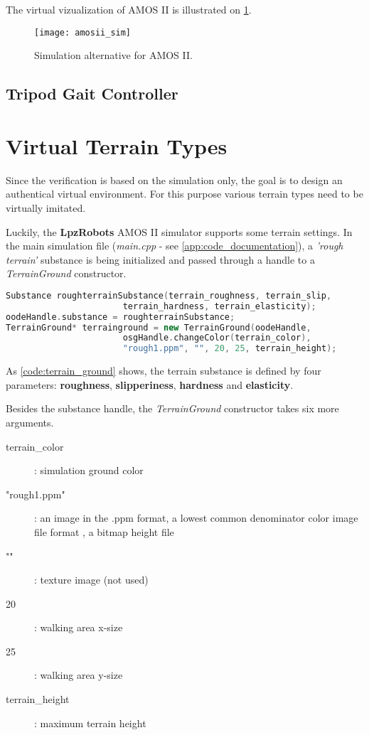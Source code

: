 The virtual vizualization of AMOS II is illustrated on \cref{img:amosii_sim}.

\begin{figure}[H]
  \centering
  \texttt{[image: amosii\_sim]}
  \caption{Simulation alternative for AMOS II.}
  \label{img:amosii_sim}
\end{figure}

\subsection{Tripod Gait Controller} \label{ssec:tripod_gait_controller}


\section{Virtual Terrain Types} \label{sec:virtual_terrain_types}
Since the verification is based on the simulation only, the goal is to design an authentical virtual environment. For this purpose various terrain types need to be virtually imitated.

Luckily, the \textbf{LpzRobots} AMOS II simulator supports some terrain settings. In the main simulation file (\textit{main.cpp} - see \ref{app:code_documentation}), a \textit{'rough terrain'} substance is being initialized and passed through a handle to a \textit{TerrainGround} constructor.

\begin{lstlisting}[language=C++, caption={Setting a terrain ground in main.cpp}, label=code:terrain_ground]
Substance roughterrainSubstance(terrain_roughness, terrain_slip,
                       terrain_hardness, terrain_elasticity);
oodeHandle.substance = roughterrainSubstance;
TerrainGround* terrainground = new TerrainGround(oodeHandle, 
                       osgHandle.changeColor(terrain_color),
                       "rough1.ppm", "", 20, 25, terrain_height);
\end{lstlisting}

As \cref{code:terrain_ground} shows, the terrain substance is defined by four parameters: \textbf{roughness}, \textbf{slipperiness}, \textbf{hardness} and \textbf{elasticity}.

Besides the substance handle, the \textit{TerrainGround} constructor takes six more arguments.

\begin{description}
\item[terrain\_color] : simulation ground color
\item["rough1.ppm"] : an image in the .ppm format, a lowest common denominator color image file format \citep{misc:ppm}, a bitmap height file
\item[""] : texture image (not used)
\item[20] : walking area x-size 
\item[25] : walking area y-size
\item[terrain\_height] : maximum terrain height
\end{description}


